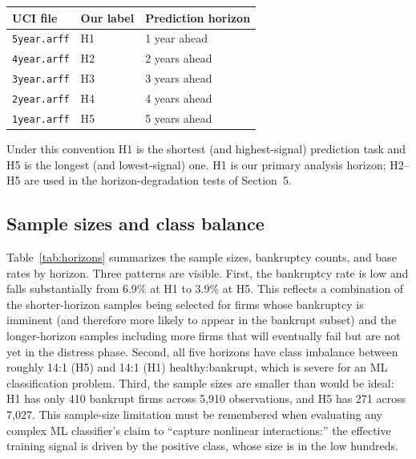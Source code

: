 \documentclass[11pt,a4paper]{article}
\begin{document}
\begin{center}
\begin{tabular}{lll}
\toprule
UCI file & Our label & Prediction horizon \\
\midrule
\texttt{5year.arff} & H1 & 1 year ahead  \\
\texttt{4year.arff} & H2 & 2 years ahead  \\
\texttt{3year.arff} & H3 & 3 years ahead  \\
\texttt{2year.arff} & H4 & 4 years ahead  \\
\texttt{1year.arff} & H5 & 5 years ahead  \\
\bottomrule
\end{tabular}
\end{center}

\noindent Under this convention H1 is the shortest (and highest-signal)
prediction task and H5 is the longest (and lowest-signal) one. H1 is our
primary analysis horizon; H2--H5 are used in the horizon-degradation tests
of Section~5.

\subsection{Sample sizes and class balance}

Table~\ref{tab:horizons} summarizes the sample sizes, bankruptcy counts, and
base rates by horizon. Three patterns are visible. First, the bankruptcy
rate is low and falls substantially from 6.9\% at H1 to 3.9\% at H5. This
reflects a combination of the shorter-horizon samples being selected for
firms whose bankruptcy is imminent (and therefore more likely to appear in
the bankrupt subset) and the longer-horizon samples including more firms
that will eventually fail but are not yet in the distress phase. Second, all
five horizons have class imbalance between roughly 14:1 (H5) and 14:1 (H1)
healthy:bankrupt, which is severe for an ML classification problem. Third,
the sample sizes are smaller than would be ideal: H1 has only 410 bankrupt
firms across 5,910 observations, and H5 has 271 across 7,027. This
sample-size limitation must be remembered when evaluating any complex
ML classifier's claim to ``capture nonlinear interactions:'' the effective
training signal is driven by the positive class, whose size is in the
low hundreds.
\end{document}
